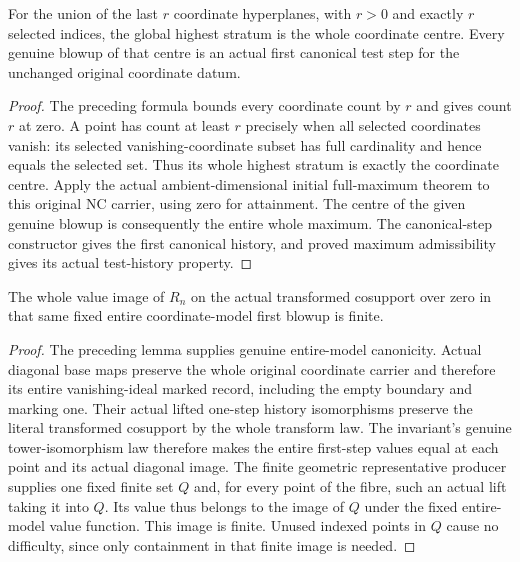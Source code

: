 \begin{lemma}
\label{hir:general-nc-entire-coordinate-first-history-canonical}
\leanok
{}
For the union of the last $r$ coordinate hyperplanes, with $r>0$ and
exactly $r$ selected indices, the global highest stratum is the whole
coordinate centre. Every genuine blowup of that centre is an actual
first canonical test step for the unchanged original coordinate datum.
\end{lemma}
\begin{proof}
The preceding formula bounds every coordinate count by $r$ and gives
count $r$ at zero. A point has count at least $r$ precisely when all
selected coordinates vanish: its selected vanishing-coordinate subset
has full cardinality and hence equals the selected set. Thus its whole
highest stratum is exactly the coordinate centre. Apply the actual
ambient-dimensional initial full-maximum theorem to this original NC
carrier, using zero for attainment. The centre of the given genuine
blowup is consequently the entire whole maximum. The canonical-step
constructor gives the first canonical history, and proved maximum
admissibility gives its actual test-history property.
\end{proof}

\begin{theorem}
\label{hir:general-nc-entire-model-finite-whole-fibre-values}
\leanok
{}
The whole value image of $R_n$ on the actual transformed cosupport over
zero in that same fixed entire coordinate-model first blowup is finite.
\end{theorem}
\begin{proof}
The preceding lemma supplies genuine entire-model canonicity. Actual
diagonal base maps preserve the whole original coordinate carrier and
therefore its entire vanishing-ideal marked record, including the empty
boundary and marking one. Their actual lifted one-step history
isomorphisms preserve the literal transformed cosupport by the whole
transform law. The invariant's genuine tower-isomorphism law therefore
makes the entire first-step values equal at each point and its actual
diagonal image. The finite geometric representative producer supplies
one fixed finite set $Q$ and, for every point of the fibre, such an actual
lift taking it into $Q$. Its value thus belongs to the image of $Q$ under
the fixed entire-model value function. This image is finite. Unused
indexed points in $Q$ cause no difficulty, since only containment in
that finite image is needed.
\end{proof}

